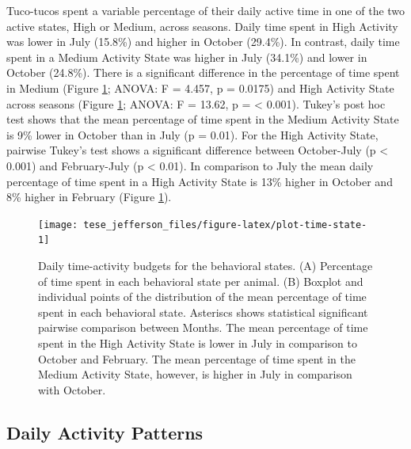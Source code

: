 \documentclass[english,msc,numbers,hidelinks]{coppe}
\begin{document}
  Tuco-tucos spent a variable percentage of their daily active time in one of the two active states, High or Medium, across seasons. Daily time spent in High Activity was lower in July (15.8\%) and higher in October (29.4\%). In contrast, daily time spent in a Medium Activity State was higher in July (34.1\%) and lower in October (24.8\%). There is a significant difference in the percentage of time spent in Medium (Figure \ref{fig:plot-time-state}; ANOVA: F = 4.457, p = 0.0175) and High Activity State across seasons (Figure \ref{fig:plot-time-state}; ANOVA: F = 13.62, p = \textless{} 0.001). Tukey's post hoc test shows that the mean percentage of time spent in the Medium Activity State is 9\% lower in October than in July (p = 0.01). For the High Activity State, pairwise Tukey's test shows a significant difference between October-July (p \textless{} 0.001) and February-July (p \textless{} 0.01). In comparison to July the mean daily percentage of time spent in a High Activity State is 13\% higher in October and 8\% higher in February (Figure \ref{fig:plot-time-state}).
  \begin{figure}

  {\centering \texttt{[image: tese\_jefferson\_files/figure-latex/plot-time-state-1]} 

  }

  \caption{Daily time-activity budgets for the behavioral states. (A) Percentage of time spent in each behavioral state per animal. (B) Boxplot and individual points of the distribution of the mean percentage of time spent in each behavioral state. Asteriscs shows statistical significant pairwise comparison between Months. The mean percentage of time spent in the High Activity State is lower in July in comparison to October and February. The mean percentage of time spent in the Medium Activity State, however, is higher in July in comparison with October.}\label{fig:plot-time-state}
  \end{figure}
  \newpage

  \hypertarget{daily-activity-patterns}{%
  \subsection{Daily Activity Patterns}\label{daily-activity-patterns}}
\end{document}
